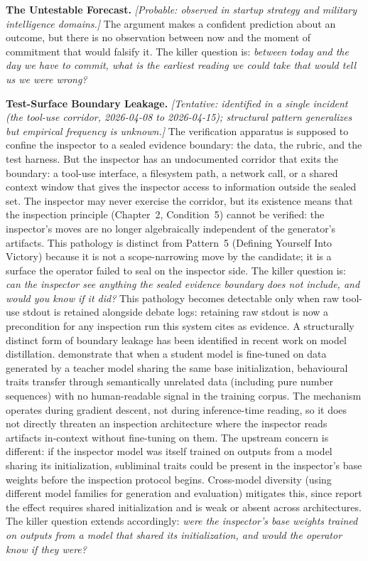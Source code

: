 \documentclass[11pt]{article}
\begin{document}
\textbf{The Untestable Forecast.} \emph{[Probable: observed in startup strategy and military intelligence domains.]} The argument makes a confident prediction about an outcome, but there is no observation between now and the moment of commitment that would falsify it. The killer question is: \emph{between today and the day we have to commit, what is the earliest reading we could take that would tell us we were wrong?}

\textbf{Test-Surface Boundary Leakage.} \emph{[Tentative: identified in a single incident (the tool-use corridor, 2026-04-08 to 2026-04-15); structural pattern generalizes but empirical frequency is unknown.]} The verification apparatus is supposed to confine the inspector to a sealed evidence boundary: the data, the rubric, and the test harness. But the inspector has an undocumented corridor that exits the boundary: a tool-use interface, a filesystem path, a network call, or a shared context window that gives the inspector access to information outside the sealed set. The inspector may never exercise the corridor, but its existence means that the inspection principle (Chapter~2, Condition~5) cannot be verified: the inspector's moves are no longer algebraically independent of the generator's artifacts. This pathology is distinct from Pattern~5 (Defining Yourself Into Victory) because it is not a scope-narrowing move by the candidate; it is a surface the operator failed to seal on the inspector side. The killer question is: \emph{can the inspector see anything the sealed evidence boundary does not include, and would you know if it did?} This pathology becomes detectable only when raw tool-use stdout is retained alongside debate logs: retaining raw stdout is now a precondition for any inspection run this system cites as evidence. A structurally distinct form of boundary leakage has been identified in recent work on model distillation. \citet{cloud2026} demonstrate that when a student model is fine-tuned on data generated by a teacher model sharing the same base initialization, behavioural traits transfer through semantically unrelated data (including pure number sequences) with no human-readable signal in the training corpus. The mechanism operates during gradient descent, not during inference-time reading, so it does not directly threaten an inspection architecture where the inspector reads artifacts in-context without fine-tuning on them. The upstream concern is different: if the inspector model was itself trained on outputs from a model sharing its initialization, subliminal traits could be present in the inspector's base weights before the inspection protocol begins. Cross-model diversity (using different model families for generation and evaluation) mitigates this, since \citeauthor{cloud2026} report the effect requires shared initialization and is weak or absent across architectures. The killer question extends accordingly: \emph{were the inspector's base weights trained on outputs from a model that shared its initialization, and would the operator know if they were?}
\end{document}
